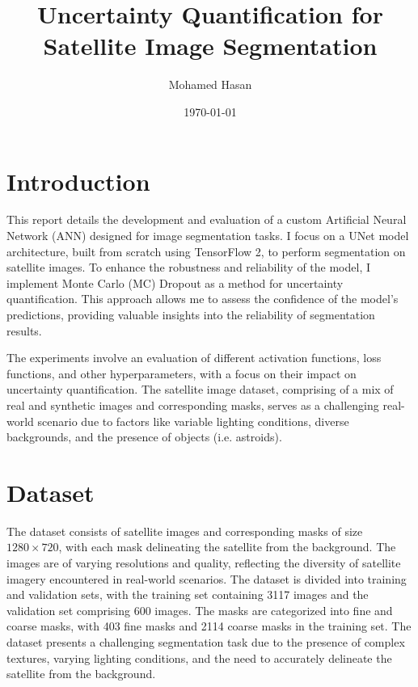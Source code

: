 \documentclass{article}
\title{Uncertainty Quantification for Satellite Image Segmentation}
\author{Mohamed Hasan}
\date{\today}
\begin{document}
\maketitle

\section{Introduction}
This report details the development and evaluation of a custom Artificial Neural Network (ANN) 
designed for image segmentation tasks. I focus on a UNet model architecture, built from scratch 
using TensorFlow 2, to perform segmentation on satellite images. To enhance the robustness and 
reliability of the model, I implement Monte Carlo (MC) Dropout as a method for uncertainty quantification. 
This approach allows me to assess the confidence of the model’s predictions, providing valuable 
insights into the reliability of segmentation results.
\vspace{1em}

The experiments involve an evaluation of different activation functions, loss functions, and 
other hyperparameters, with a focus on their impact on uncertainty quantification. The satellite 
image dataset, comprising of a mix of real and synthetic images and corresponding masks, serves as 
a challenging real-world scenario due to factors like variable lighting conditions, diverse backgrounds, 
and the presence of objects (i.e. astroids).


\section{Dataset}
The dataset consists of satellite images and corresponding masks of size $1280 \times 720$, with each 
mask delineating the satellite from the background. The images are of varying resolutions and quality, 
reflecting the diversity of satellite imagery encountered in real-world scenarios. The dataset is divided 
into training and validation sets, with the training set containing 3117 images and the validation set
comprising 600 images. The masks are categorized into fine and coarse masks, with 403 fine masks
and 2114 coarse masks in the training set. The dataset presents a challenging segmentation task due
to the presence of complex textures, varying lighting conditions, and the need to accurately
delineate the satellite from the background.
\end{document}

